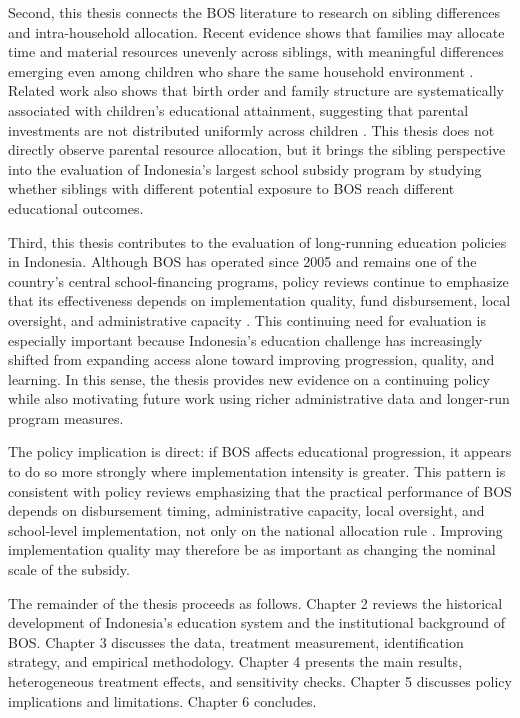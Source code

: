 \documentclass[a4paper, 12pt]{article}
\begin{document}
\begin{doublespacing}
Second, this thesis connects the BOS literature to research on sibling differences and intra-household allocation. Recent evidence shows that families may allocate time and material resources unevenly across siblings, with meaningful differences emerging even among children who share the same household environment \citep{Kirchberger2020}. Related work also shows that birth order and family structure are systematically associated with children's educational attainment, suggesting that parental investments are not distributed uniformly across children \citep{DeHaan2010,BaggerEtAl2021}. This thesis does not directly observe parental resource allocation, but it brings the sibling perspective into the evaluation of Indonesia's largest school subsidy program by studying whether siblings with different potential exposure to BOS reach different educational outcomes.

Third, this thesis contributes to the evaluation of long-running education policies in Indonesia. Although BOS has operated since 2005 and remains one of the country's central school-financing programs, policy reviews continue to emphasize that its effectiveness depends on implementation quality, fund disbursement, local oversight, and administrative capacity \citep{WorldBank2014,SMERUUNESCO2024}. This continuing need for evaluation is especially important because Indonesia's education challenge has increasingly shifted from expanding access alone toward improving progression, quality, and learning. In this sense, the thesis provides new evidence on a continuing policy while also motivating future work using richer administrative data and longer-run program measures.

The policy implication is direct: if BOS affects educational progression, it appears to do so more strongly where implementation intensity is greater. This pattern is consistent with policy reviews emphasizing that the practical performance of BOS depends on disbursement timing, administrative capacity, local oversight, and school-level implementation, not only on the national allocation rule \citep{WorldBank2008,WorldBank2014,SMERUUNESCO2024}. Improving implementation quality may therefore be as important as changing the nominal scale of the subsidy.

The remainder of the thesis proceeds as follows. Chapter 2 reviews the historical development of Indonesia's education system and the institutional background of BOS. Chapter 3 discusses the data, treatment measurement, identification strategy, and empirical methodology. Chapter 4 presents the main results, heterogeneous treatment effects, and sensitivity checks. Chapter 5 discusses policy implications and limitations. Chapter 6 concludes.



\end{doublespacing}
\end{document}
